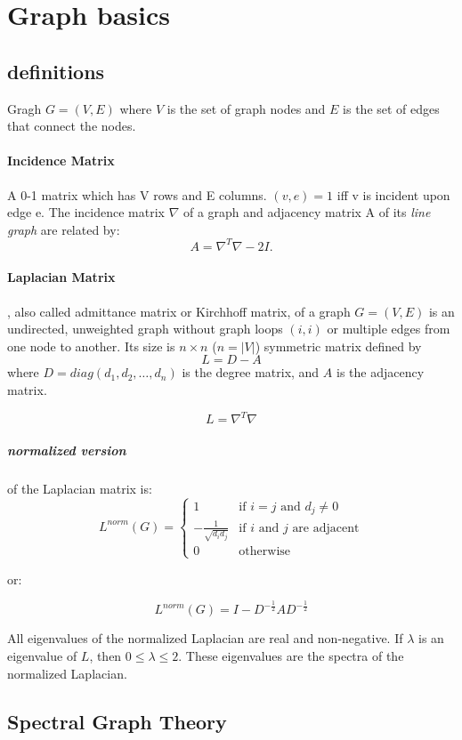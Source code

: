 
\section{Graph basics} 
\label{section:graph-basics} 

\subsection{definitions} 

Gragh $ G = (V, E) $ where $V$ is the set of graph nodes 
and $E$ is the set of edges that connect the nodes. 

\paragraph{Incidence Matrix}
A 0-1 matrix which has V rows and E columns. $(v,e)=1$ iff v is incident upon edge e.
The incidence matrix $\nabla$ of a graph and adjacency matrix A of its {\em line graph} are related by:
$$ A= {\nabla}^{T}\nabla - 2 I. $$

\paragraph{Laplacian Matrix},
also called admittance matrix or Kirchhoff matrix, of a graph $G=(V,E)$ is an undirected, unweighted graph without graph loops $(i, i)$ or multiple edges from one node
to another. Its size is $n \times n$ ($n=|V|$) symmetric matrix defined by
$$ L = D - A $$
where $D = diag(d_1, d_2, \dots, d_n)$ is the degree matrix, and $A$ is the adjacency matrix.

$$ L = {\nabla}^{T}\nabla $$

\subparagraph{normalized version} of the Laplacian matrix is:
$$ L^{norm}(G) =
  \begin{cases}
    1 & \text{if $i=j$ and $d_j \not= 0$} \\
    - \frac{1}{\sqrt{d_i d_j}} & \text{if $i$ and $j$ are adjacent} \\
    0 & \text{otherwise}
  \end{cases}
$$

or:

$$ L^{norm}(G) = I - D^{- \frac{1}{2}} A D^{- \frac{1}{2}} $$

All eigenvalues of the normalized Laplacian are real and non-negative. If $\lambda$ is an eigenvalue of $L$, then $ 0 \le \lambda \le 2 $. These eigenvalues are the spectra of the normalized Laplacian.

\subsection{Spectral Graph Theory}

